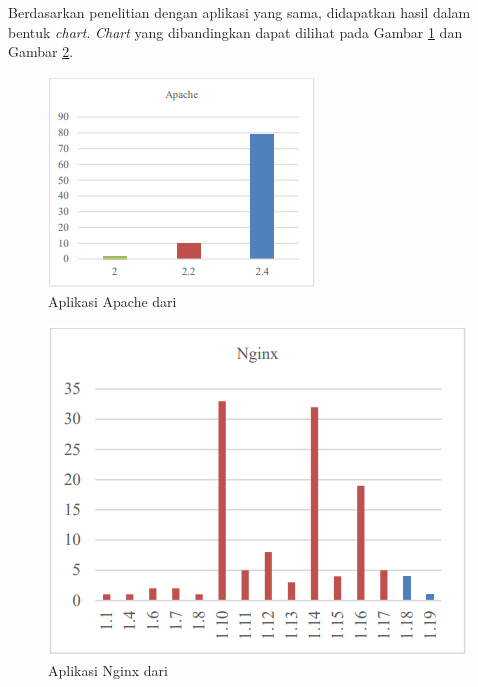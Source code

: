 Berdasarkan penelitian dengan aplikasi yang sama, didapatkan hasil dalam bentuk \textit{chart}. \textit{Chart} yang dibandingkan dapat dilihat pada Gambar \ref{fig:data_sample_apache_p} dan Gambar \ref{fig:data_sample_nginx_p}.
\begin{figure}[H]
	\centering  
	\includegraphics[scale=0.8]{Gambar/chart_pascal_apache.PNG}  
	\caption{Aplikasi Apache dari \cite{pascal}} 
	\label{fig:data_sample_apache_p} 
\end{figure}
\begin{figure}[H]
	\centering  
	\includegraphics[scale=0.7]{Gambar/chart_pascal_nginx.PNG}  
	\caption{Aplikasi Nginx dari \cite{pascal}} 
	\label{fig:data_sample_nginx_p} 
\end{figure}

